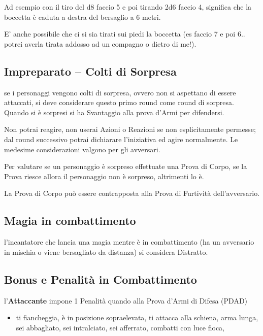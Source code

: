 \documentclass[12pt,a4paper,twoside,openany]{book}
\begin{document}
\begin{multicols}{2}
Ad esempio con il tiro del d8 faccio 5 e poi tirando 2d6 faccio 4, significa che la boccetta è caduta a destra del bersaglio a 6 metri.

E' anche possibile che ci si sia tirati sui piedi la boccetta (es faccio 7 e poi 6.. potrei averla tirata addosso ad un compagno o dietro di me!).

\subsection{Impreparato -- Colti di Sorpresa}\label{coltidisorpresa}

se i personaggi vengono colti di sorpresa, ovvero non si aspettano di essere attaccati, si deve considerare questo primo round come round di sorpresa. Quando si è sorpresi si ha Svantaggio alla prova d'Armi per difendersi.

Non potrai reagire, non userai Azioni o Reazioni se non esplicitamente permesse; dal round successivo potrai dichiarare l'iniziativa ed agire normalmente. Le medesime considerazioni valgono per gli avversari.

Per valutare se un personaggio è sorpreso effettuate una Prova di Corpo, se la Prova riesce allora il personaggio non è sorpreso, altrimenti lo è.

La Prova di Corpo può essere contrapposta alla Prova di Furtività dell'avversario.

\subsection{Magia in combattimento}\label{magiaincombattimento}

l'incantatore che lancia una magia mentre è in combattimento (ha un avversario in mischia o viene bersagliato da distanza) si considera Distratto.

\subsection{Bonus e Penalità in Combattimento}

l'\textbf{Attaccante} impone 1 Penalità quando alla Prova d'Armi di Difesa (PDAD)

\begin{itemize}

\item ti fiancheggia, è in posizione sopraelevata, ti attacca alla schiena, arma lunga, sei abbagliato, sei intralciato, sei afferrato, combatti con luce fioca, 


\end{itemize}
\end{multicols}
\end{document}
